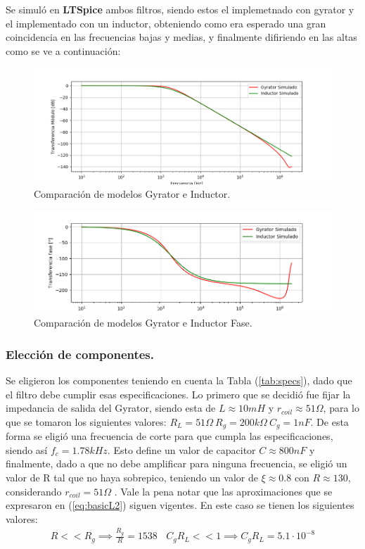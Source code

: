 Se simuló en \textbf{LTSpice} ambos filtros, siendo estos el implemetnado con gyrator y el implementado con un inductor, obteniendo como era esperado una gran coincidencia en las frecuencias bajas y medias, y finalmente difiriendo en las altas como se ve a continuación:
\begin{figure}[H]	
	\centering
	\includegraphics[width=\textwidth]{ImagenesEj2/simLP.PNG}
	\caption{Comparación de modelos Gyrator e Inductor.}
	\label{fig:gyrIndL}
\end{figure}
\begin{figure}[H]	
	\centering
	\includegraphics[width=\textwidth]{ImagenesEj2/simLPP.PNG}
	\caption{Comparación de modelos Gyrator e Inductor Fase.}
	\label{fig:gyrIndPL}
\end{figure}
\subsubsection{Elección de componentes.}

Se eligieron los componentes teniendo en cuenta la Tabla (\ref{tab:specs}), dado que el filtro debe cumplir esas especificaciones.
Lo primero que se decidió fue fijar la impedancia de salida del Gyrator, siendo esta de $L \approx 10mH $ y $r_{coil} \approx 51\Omega $, para lo que se tomaron los siguientes valores: $R_L = 51\Omega \ R_g = 200k\Omega \ C_g = 1nF$. De esta forma se eligió una frecuencia de corte para que cumpla las especificaciones, siendo así $f_c =1.78kHz $. Esto define un valor de capacitor $C \approx 800nF$ y finalmente, dado a que no debe amplificar para ninguna frecuencia, se eligió un valor de R tal que no haya sobrepico, teniendo un valor de $\xi \approx 0.8 $ con $R \approx 130 $, considerando $r_{coil} = 51\Omega$ . 
Vale la pena notar que las aproximaciones que se expresaron en (\ref{eq:basicL2}) siguen vigentes. En este caso se tienen los siguientes valores:
\begin{align}  R<<R_g \implies  \frac{R_g}{R}=  1538 \ \ \ \ C_gR_L << 1 \implies C_gR_L =5.1\cdot 10^{-8} \end{align}


